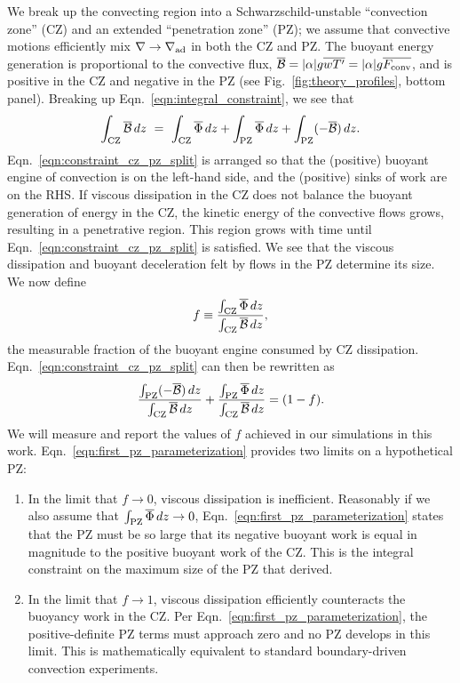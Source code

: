 \documentclass[twocolumn, linenumbers]{aastex631}
\newcommand{\gradad}{\ensuremath{\nabla_{\rm{ad}}}}
\newcommand{\justgrad}{\ensuremath{\nabla}}
\newcommand{\Fconv}{\ensuremath{F_{\rm{conv}}}}
\renewcommand{\bar}[1]{\overline{#1}}
\newcommand{\editone}[1]{#1}
\begin{document}
We break up the convecting region into a Schwarzschild-unstable ``convection zone'' (CZ) and an extended ``penetration zone'' (PZ); we assume that convective motions efficiently mix $\justgrad \rightarrow \gradad$ in both the CZ and PZ.
The buoyant energy generation is proportional to the convective flux, $\bar{\mathcal{B}} = |\alpha|g\bar{w T'} = |\alpha| g \bar{\Fconv}$, and is positive in the CZ and negative in the PZ (see Fig.~\ref{fig:theory_profiles}, bottom panel).
Breaking up Eqn.~\ref{eqn:integral_constraint}, we see that
\begin{equation}
\int_{\rm{CZ}} \bar{\mathcal{B}}\,dz \,\,=\,\,
\int_{\rm{CZ}} \bar{\Phi}\,dz + \int_{\rm{PZ}} \bar{\Phi}\,dz + \int_{\rm{PZ}}(-\bar{\mathcal{B}})\,dz.
\label{eqn:constraint_cz_pz_split}
\end{equation}
Eqn.~\ref{eqn:constraint_cz_pz_split} is arranged so that the (positive) buoyant engine of convection is on the left-hand side, and the (positive) sinks of work are on the RHS.
If viscous dissipation in the CZ does not balance the buoyant generation of energy in the CZ, the kinetic energy of the convective flows grows, resulting in a penetrative region.
This region grows with time until Eqn.~\ref{eqn:constraint_cz_pz_split} is satisfied.
We see that the viscous dissipation and \editone{buoyant deceleration} felt by flows in the PZ determine its size.
We now define
\begin{equation}
f \equiv \frac{\int_{\rm{CZ}} \bar{\Phi}\,dz}{\int_{\rm{CZ}}\bar{\mathcal{B}}\,dz},
\label{eqn:f_defn}
\end{equation}
the measurable fraction of the buoyant engine consumed by CZ dissipation.
Eqn.~\ref{eqn:constraint_cz_pz_split} can then be rewritten as
\begin{equation}
\frac{\int_{\rm{PZ}}(-\bar{\mathcal{B}})\,dz}{\int_{\rm{CZ}} \bar{\mathcal{B}}\,dz}
+ \frac{\int_{\rm{PZ}} \bar{\Phi}\,dz }{\int_{\rm{CZ}} \bar{\mathcal{B}}\,dz}
= (1 - f).
\label{eqn:first_pz_parameterization}
\end{equation}
We will measure and report the values of $f$ achieved in our simulations in this work.
Eqn.~\ref{eqn:first_pz_parameterization} provides two limits on a hypothetical PZ:
\begin{enumerate}
\item In the limit that $f \rightarrow 0$, viscous dissipation is inefficient.
Reasonably if we also assume that $\int_{\rm{PZ}}\bar{\Phi}\,dz \rightarrow 0$, Eqn.~\ref{eqn:first_pz_parameterization} states that the PZ must be so large that its negative buoyant work is equal in magnitude to the positive buoyant work of the CZ.
This is the integral constraint on the maximum size of the PZ that \citet{roxburgh1989} derived.
\item In the limit that $f \rightarrow 1$, viscous dissipation efficiently counteracts the buoyancy work in the CZ.
Per Eqn.~\ref{eqn:first_pz_parameterization}, the positive-definite PZ terms must approach zero and no PZ develops in this limit.
This is mathematically equivalent to standard boundary-driven convection experiments.
\end{enumerate}
\end{document}
